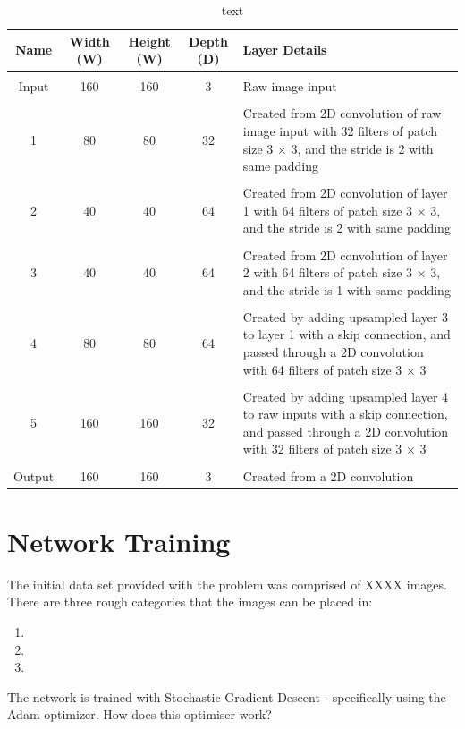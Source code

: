 \documentclass[a4paper]{article}
\begin{document}
\begin{table}[h]
\centering
\caption{text}\scriptsize
\begin{tabular}{ccccp{8cm}}
\toprule
\textbf{Name} & \textbf{Width (W)} & \textbf{Height (W)} & \textbf{Depth (D)} & Layer Details\\  
\midrule
 & & & &\\
Input & 160 & 160 & 3 & Raw image input\\
 & & & &\\
1 & 80 & 80 & 32 & Created from 2D convolution of raw image input with 32 filters of patch size 3 $\times $ 3, and the stride is 2 with same padding\\
 & & & &\\
2 & 40 & 40 & 64 & Created from 2D convolution of layer 1 with 64 filters of patch size 3 $\times $ 3, and the stride is 2 with same padding\\
 & & & &\\
3 & 40 & 40 & 64 & Created from 2D convolution of layer 2 with 64 filters of patch size 3 $\times$ 3, and the stride is 1 with same padding\\
 & & & &\\
4 & 80 & 80 & 64 & Created by adding upsampled layer 3 to layer 1 with a skip connection, and passed through a 2D convolution with 64 filters of patch size 3 $\times$ 3\\
 & & & &\\
5 & 160 & 160 & 32 & Created by adding upsampled layer 4 to raw inputs with a skip connection, and passed through a 2D convolution with 32 filters of patch size 3 $\times$ 3\\
& & & &\\
Output & 160 & 160 & 3 & Created from a 2D convolution\\
\bottomrule
\end{tabular}
\end{table}

\clearpage

\section{Network Training}
The initial data set provided with the problem was comprised of XXXX images. There are three rough categories that the images can be placed in:
\begin{enumerate}
\item 
\item 
\item 
\end{enumerate}
The network is trained with Stochastic Gradient Descent - specifically using the Adam optimizer. How does this optimiser work?
\end{document}
